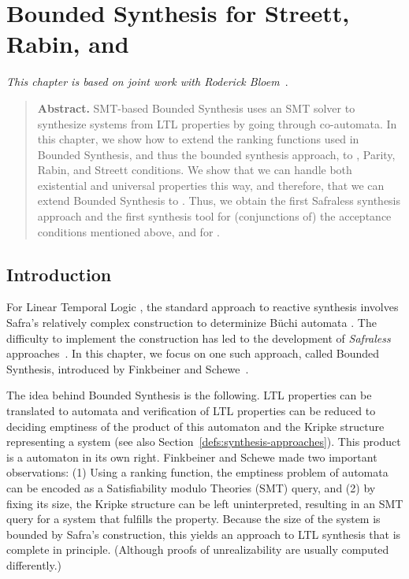 \chapter{Bounded Synthesis for Streett, Rabin, and \CTLstar}\label{chap:bosy:ctlstar}

\hfill {\footnotesize\textit{This chapter is based on joint work with Roderick Bloem~\cite{CTLstarCAV}}.~~~~~~~~}

\begin{quotation}
\noindent\textbf{Abstract.}
SMT-based Bounded Synthesis uses an SMT solver to synthesize systems from 
LTL properties by going through co-\buchi automata. In this chapter,
we show how to extend
the ranking functions used in Bounded Synthesis, and thus the bounded
synthesis approach, to \buchi, Parity, Rabin, and Streett
conditions. We show that we can handle both existential and universal
properties this way, and therefore, that we can extend Bounded
Synthesis to \CTLstar. Thus, we obtain the first Safraless synthesis
approach and the first synthesis tool for (conjunctions of) the acceptance conditions
mentioned above, and for \CTLstar.
\end{quotation}

\section{Introduction}
For Linear Temporal Logic \cite{pnueli1977temporal},
the standard approach to reactive synthesis involves Safra's relatively complex
construction \cite{Safra}
to determinize B\"uchi automata \cite{DBLP:conf/popl/PnueliR89}.
The difficulty to implement the construction has led to the development
of \emph{Safraless} approaches~\cite{KupfermanV05,BS}.
In this chapter, we focus on one such approach, called Bounded Synthesis,
introduced by Finkbeiner and Schewe~\cite{BS}.

The idea behind Bounded Synthesis is the following.
LTL properties can be translated to \buchi automata \cite{DBLP:journals/iandc/VardiW94}
and verification of LTL properties can be reduced to deciding
emptiness of the product of this automaton and the Kripke structure
representing a system
\cite{DBLP:conf/lop/MannaW81,DBLP:conf/focs/WolperVS83}
(see also Section~\ref{defs:synthesis-approaches}).
This product is a \buchi automaton in its own right.
Finkbeiner and Schewe made two important observations:
(1) Using a ranking function,
    the emptiness problem of \buchi automata
    can be encoded as a Satisfiability modulo Theories (SMT) query, and
(2) by fixing its size, the Kripke structure can be left uninterpreted,
    resulting in an SMT query for a system that fulfills the property.
Because the size of the system is bounded by Safra's construction,
this yields an approach to LTL synthesis that is complete in principle.
(Although proofs of unrealizability are usually computed differently.)  


